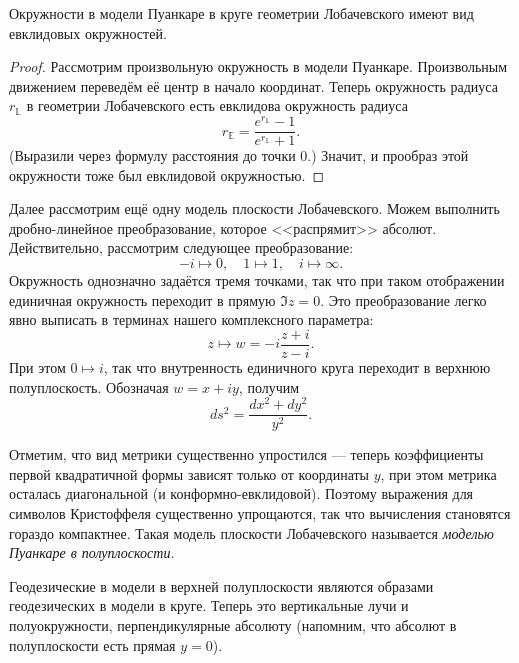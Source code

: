 \begin{proposition}
	Окружности в модели Пуанкаре в круге геометрии Лобачевского имеют вид евклидовых окружностей.
\end{proposition}

\begin{proof}
	Рассмотрим произвольную окружность в модели Пуанкаре. Произвольным движением переведём её центр в начало координат. Теперь окружность радиуса $r_{\mathbb{L}}$ в геометрии Лобачевского есть евклидова окружность радиуса
	\begin{equation} \label{eq:LtoE}
		r_{\mathbb{E}} = \frac{e^{r_{\mathbb{L}}} - 1}{e^{r_{\mathbb{L}}} + 1}.
	\end{equation}
	(Выразили через формулу расстояния до точки $0$.) Значит, и прообраз этой окружности тоже был евклидовой окружностью.
\end{proof}

Далее рассмотрим ещё одну модель плоскости Лобачевского. Можем выполнить дробно-линейное преобразование, которое <<распрямит>> абсолют. Действительно, рассмотрим следующее преобразование:
\[
	-i \mapsto 0,\quad 1 \mapsto 1,\quad i \mapsto \infty.
\]
Окружность однозначно задаётся тремя точками, так что при таком отображении единичная окружность переходит в прямую $\Im z = 0$. Это преобразование легко явно выписать в терминах нашего комплексного параметра:
\[
	z \mapsto w = -i\frac{z + i}{z - i}.
\]
При этом $0 \mapsto i$, так что внутренность единичного круга переходит в верхнюю полуплоскость. Обозначая $w = x + iy$, получим
\[
	ds^2 = \frac{dx^2 + dy^2}{y^2}.
\]

Отметим, что вид метрики существенно упростился --- теперь коэффициенты первой квадратичной формы зависят только от координаты $y$, при этом метрика осталась диагональной (и конформно-евклидовой). Поэтому выражения для символов Кристоффеля существенно упрощаются, так что вычисления становятся гораздо компактнее. Такая модель плоскости Лобачевского называется \textit{моделью Пуанкаре в полуплоскости}.

Геодезические в модели в верхней полуплоскости являются образами геодезических в модели в круге. Теперь это вертикальные лучи и полуокружности, перпендикулярные абсолюту (напомним, что абсолют в полуплоскости есть прямая $y = 0$).

